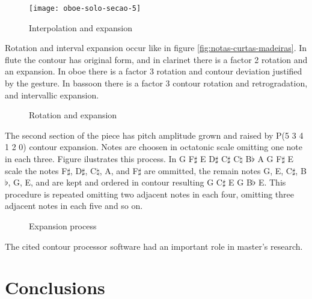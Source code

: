 \begin{figure}[!p]
  \centering
  \texttt{[image: oboe-solo-secao-5]}
  \caption{Interpolation and expansion}
  \label{fig:interpolacao-expansao}
\end{figure}

Rotation and interval expansion occur like in figure
\ref{fig:notas-curtas-madeiras}. In flute the contour has original
form, and in clarinet there is a factor 2 rotation and an
expansion. In oboe there is a factor 3 rotation and contour deviation
justified by the gesture. In bassoon there is a factor 3 contour
rotation and retrogradation, and intervallic expansion.

\begin{figure}[!p]
  \centering

  \subfloat[original]{
    \texttt{[image: c-534120]}
    \label{fig:rot-0}
  }
  \subfloat[rot 2]{
    \texttt{[image: c-412053]}
    \label{fig:rot-2}
  }
  \subfloat[rot 3]{
    \texttt{[image: c-120534]}
    \label{fig:rot-3}
  }
  \caption{Rotation and expansion}
  \label{fig:rotacao-expansao}
\end{figure}

The second section of the piece has pitch amplitude grown and raised
by P(5 3 4 1 2 0) contour expansion. Notes are choosen in octatonic
scale omitting one note in each three. Figure ilustrates this
process. In G F$\sharp$ E D$\sharp$ C$\sharp$ C$\natural$ B$\flat$ A G
F$\sharp$ E scale the notes F$\sharp$, D$\sharp$, C$\natural$, A, and
F$\sharp$ are ommitted, the remain notes G, E, C$\sharp$, B$\flat$, G,
E, and are kept and ordered in contour resulting G C$\sharp$ E G
B$\flat$ E. This procedure is repeated omitting two adjacent notes in
each four, omitting three adjacent notes in each five and so on.

\begin{figure}[!p]
  \centering

  \caption{Expansion process}
\end{figure}

The cited contour processor software had an important role in master's
research.

\section{Conclusions}
\label{sec:conclusions}

